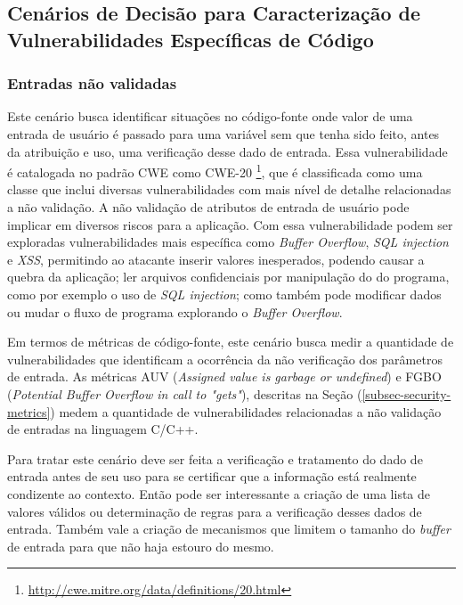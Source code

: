 \subsection{Cenários de Decisão para Caracterização de Vulnerabilidades Específicas de Código}

\subsubsection{Entradas não validadas}

Este cenário busca identificar situações no código-fonte onde valor de uma entrada de usuário é passado para uma variável sem que tenha sido feito, antes da atribuição e uso, uma verificação desse dado de entrada.
%
Essa vulnerabilidade é catalogada no padrão CWE como CWE-20 \footnote{\url{http://cwe.mitre.org/data/definitions/20.html}}, que é classificada como uma classe que inclui diversas vulnerabilidades com mais nível de detalhe relacionadas a não validação.
%
A não validação de atributos de entrada de usuário pode implicar em diversos riscos para a aplicação.
%
Com essa vulnerabilidade podem ser exploradas vulnerabilidades  mais específica como \emph{Buffer Overflow}, \emph{SQL injection} e \emph{XSS}, permitindo ao atacante inserir valores inesperados, podendo causar a quebra da aplicação; ler arquivos confidenciais por manipulação do do programa, como por exemplo o uso de \emph{SQL injection}; como também pode modificar dados ou mudar o fluxo de programa explorando o \emph{Buffer Overflow}.

Em termos de métricas de código-fonte, este cenário busca medir a quantidade de vulnerabilidades que identificam a ocorrência da não verificação dos parâmetros de entrada. As métricas AUV (\emph{Assigned value is garbage or undefined}) e FGBO (\emph{Potential Buffer Overflow in call to "gets"}), descritas na Seção (\ref{subsec-security-metrics}) medem a quantidade de vulnerabilidades relacionadas a não validação de entradas na linguagem C/C++. 

Para tratar este cenário deve ser feita a verificação e tratamento do dado de entrada antes de seu uso para se certificar que a informação está realmente condizente ao contexto. Então pode ser interessante a criação de uma lista de valores válidos ou determinação de regras para a verificação desses dados de entrada. Também vale a criação de mecanismos que limitem o tamanho do \emph{buffer} de entrada para que não haja estouro do mesmo.


